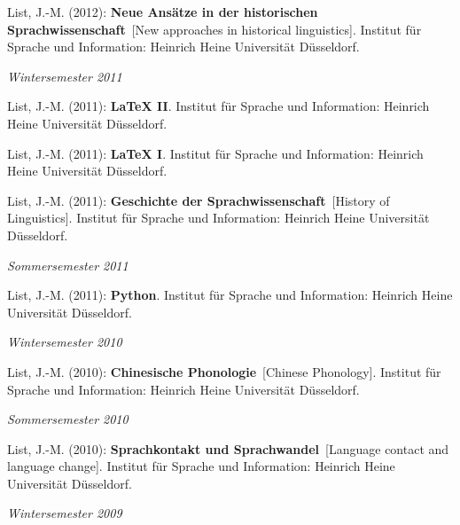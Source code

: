 \nopagebreak\noindent List, J.-M. (2012): \textbf{Neue Ansätze in der historischen Sprachwissenschaft}\ [New approaches in historical linguistics]. Institut für Sprache und Information: Heinrich Heine Universität Düsseldorf.\vspace{0.25cm}
\par
\noindent\textit{Wintersemester 2011}\par\nopagebreak\vspace{0.25cm}
\nopagebreak\noindent List, J.-M. (2011): \textbf{LaTeX II}. Institut für Sprache und Information: Heinrich Heine Universität Düsseldorf.\vspace{0.25cm}
\par
\nopagebreak\noindent List, J.-M. (2011): \textbf{LaTeX I}. Institut für Sprache und Information: Heinrich Heine Universität Düsseldorf.\vspace{0.25cm}
\par
\nopagebreak\noindent List, J.-M. (2011): \textbf{Geschichte der Sprachwissenschaft}\ [History of Linguistics]. Institut für Sprache und Information: Heinrich Heine Universität Düsseldorf.\vspace{0.25cm}
\par
\noindent\textit{Sommersemester 2011}\par\nopagebreak\vspace{0.25cm}
\nopagebreak\noindent List, J.-M. (2011): \textbf{Python}. Institut für Sprache und Information: Heinrich Heine Universität Düsseldorf.\vspace{0.25cm}
\par
\noindent\textit{Wintersemester 2010}\par\nopagebreak\vspace{0.25cm}
\nopagebreak\noindent List, J.-M. (2010): \textbf{Chinesische Phonologie}\ [Chinese Phonology]. Institut für Sprache und Information: Heinrich Heine Universität Düsseldorf.\vspace{0.25cm}
\par
\noindent\textit{Sommersemester 2010}\par\nopagebreak\vspace{0.25cm}
\nopagebreak\noindent List, J.-M. (2010): \textbf{Sprachkontakt und Sprachwandel}\ [Language contact and language change]. Institut für Sprache und Information: Heinrich Heine Universität Düsseldorf.\vspace{0.25cm}
\par
\noindent\textit{Wintersemester 2009}\par\nopagebreak\vspace{0.25cm}
